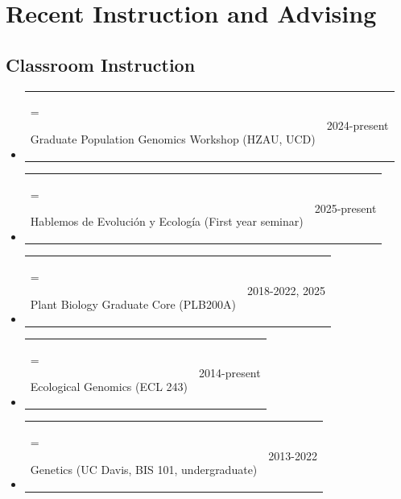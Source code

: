 \documentclass[letterpaper,10pt]{article}
\makeatletter
\newlength{\cvhang}\setlength{\cvhang}{1.5em}
\newcommand{\cvitem}[3][\cvhang]{%
  \item\begin{tabularx}{\dimexpr\linewidth+\cvhang\relax}{@{}>{\hangindent=#1\hangafter=1\raggedright\arraybackslash}X@{\hspace{1.5em}}r@{}}
    #2 & #3
  \end{tabularx}%
}
\makeatother
\begin{document}
\section*{Recent Instruction and Advising}

\subsection*{Classroom Instruction}
\begin{itemize}
\cvitem{Graduate Population Genomics Workshop (HZAU, UCD)}{2024-present}
\cvitem{Hablemos de Evoluci\'on y Ecolog\'ia (First year seminar)}{2025-present}
\cvitem{Plant Biology Graduate Core (PLB200A)}{2018-2022, 2025}
\cvitem{Ecological Genomics (ECL 243)}{2014-present}
\cvitem{Genetics (UC Davis, BIS 101, undergraduate)}{2013-2022}
\end{itemize}
\end{document}
